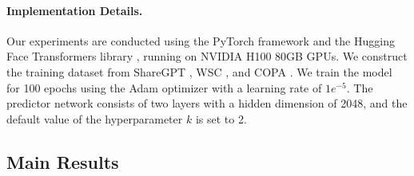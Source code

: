 \documentclass{llmxive}
\begin{document}
\paragraph{Implementation Details.}
Our experiments are conducted using the PyTorch framework \citep{paszke2019pytorch} and the Hugging Face Transformers library \citep{wolf2020transformers}, running on NVIDIA H100 80GB GPUs. We construct the training dataset from ShareGPT \cite{chen2024sharegpt4v}, WSC \cite{levesque2012winograd}, and COPA \cite{roemmele2011choice}. We train the model for 100 epochs using the Adam optimizer with a learning rate of $1e^{-5}$. The predictor network consists of two layers with a hidden dimension of 2048, and the default value of the hyperparameter $k$ is set to 2.


\subsection{Main Results}

\end{document}
